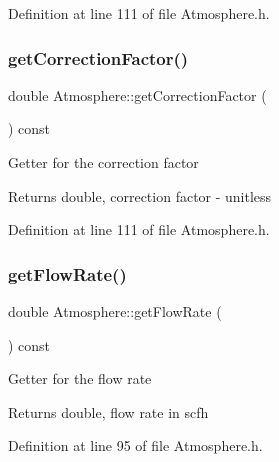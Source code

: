 Definition at line 111 of file Atmosphere.\+h.

\mbox{\label{class_atmosphere_a79c94343c7b6659b2f79688a1ba69aed}} 
\subsubsection{\texorpdfstring{get\+Correction\+Factor()}{getCorrectionFactor()}\hspace{0.1cm}{\footnotesize\ttfamily [3/3]}}
{\footnotesize\ttfamily double Atmosphere\+::get\+Correction\+Factor (\begin{DoxyParamCaption}{ }\end{DoxyParamCaption}) const\hspace{0.3cm}{\ttfamily [inline]}}

Getter for the correction factor \begin{DoxyReturn}{Returns}
double, correction factor -\/ unitless 
\end{DoxyReturn}


Definition at line 111 of file Atmosphere.\+h.

\mbox{\label{class_atmosphere_ad34708b12c8c9af4fce47669d68ebf4d}} 
\subsubsection{\texorpdfstring{get\+Flow\+Rate()}{getFlowRate()}\hspace{0.1cm}{\footnotesize\ttfamily [1/3]}}
{\footnotesize\ttfamily double Atmosphere\+::get\+Flow\+Rate (\begin{DoxyParamCaption}{ }\end{DoxyParamCaption}) const\hspace{0.3cm}{\ttfamily [inline]}}

Getter for the flow rate \begin{DoxyReturn}{Returns}
double, flow rate in scfh 
\end{DoxyReturn}


Definition at line 95 of file Atmosphere.\+h.

\mbox{\label{class_atmosphere_ad34708b12c8c9af4fce47669d68ebf4d}} 
